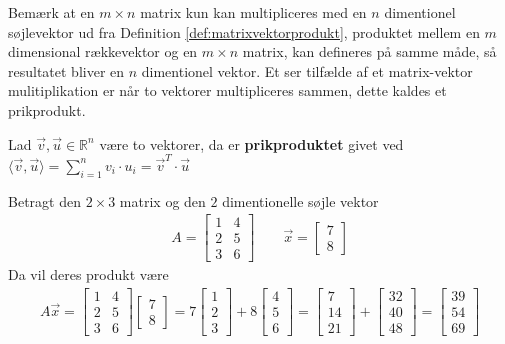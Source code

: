 Bemærk at en $m \times n$ matrix kun kan multipliceres med en $n$ dimentionel søjlevektor ud fra Definition \ref{def:matrixvektorprodukt}, produktet mellem en $m$ dimensional rækkevektor og en $m \times n$ matrix, kan defineres på samme måde, så resultatet bliver en $n$ dimentionel vektor. 
Et ser tilfælde af et matrix-vektor mulitiplikation er når to vektorer multipliceres sammen, dette kaldes et prikprodukt.
\begin{defn}[Prikproduktet]
Lad $\vec{v}, \vec{u} \in \mathds{R}^n$ være to vektorer, da er \textbf{prikproduktet} givet ved $\langle\vec{v},\vec{u}\rangle = \sum_{i=1}^n v_i \cdot u_i = \vec{v}^T \cdot \vec{u} $
\end{defn}
\begin{eks}
Betragt den $2 \times 3$ matrix og den $2$ dimentionelle søjle vektor
\begin{align*}
A=
\begin{bmatrix}
1 & 4\\
2 & 5\\
3 & 6
\end{bmatrix}
\qquad
\vec{x}=
\begin{bmatrix}
7\\
8
\end{bmatrix}
\end{align*}
Da vil deres produkt være
\begin{align*}
A\vec{x}= \begin{bmatrix}
1 & 4\\
2 & 5\\
3 & 6
\end{bmatrix}
\begin{bmatrix}
7\\
8
\end{bmatrix}
=
7
\begin{bmatrix}
1\\
2\\
3
\end{bmatrix}
+ 8
\begin{bmatrix}
4\\
5\\
6
\end{bmatrix}=
\begin{bmatrix}
7\\
14\\
21
\end{bmatrix}
+
\begin{bmatrix}
32\\
40\\
48
\end{bmatrix}
=
\begin{bmatrix}
39\\
54\\
69
\end{bmatrix}
\end{align*}
\end{eks}
